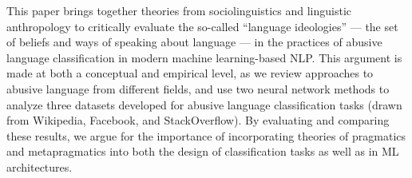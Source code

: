 This paper brings together theories from sociolinguistics and linguistic anthropology to critically evaluate the so-called ``language ideologies'' — the set of beliefs and ways of speaking about language — in the practices of abusive language classification in modern machine learning-based NLP. This argument is made at both a conceptual and empirical level, as we review approaches to abusive language from different fields, and use two neural network methods to analyze three datasets developed for abusive language classification tasks (drawn from Wikipedia, Facebook, and StackOverflow). By evaluating and comparing these results, we argue for the importance of incorporating theories of pragmatics and metapragmatics into both the design of classification tasks as well as in ML architectures.
